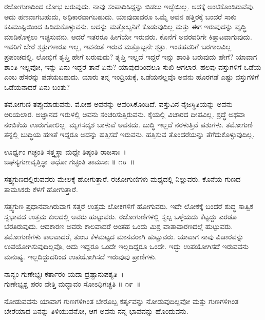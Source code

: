 ರಜೋಗುಣದಿಂದ ಲೋಭ ಬರುವುದು. ನಾವು ಸಂಪಾದಿಸಿದ್ದನ್ನು ಬಿಡಲು ಇಚ್ಛೆಯಿಲ್ಲ. ಅದಕ್ಕೆ ಅಂಟಿಕೊಂಡಿರುವೆವು. ಅದು ಹಣವಾಗಬಹುದು, ಅಧಿಕಾರವಾಗಬಹುದು. ಯಾವು\-ದಾದರೂ ಒಮ್ಮೆ ಅವನ ಹತ್ತಿರಕ್ಕೆ ಬಂದರೆ ಸಾಕು ಕಪಿಮುಷ್ಟಿಯಿಂದ ಹಿಡಿದುಕೊಳ್ಳುವನು. ಅದನ್ನು ಮತ್ತೊಬ್ಬನಿಗೆ ಕೊಡುವುದಿಲ್ಲ ಮತ್ತು ಈಗ ಇರುವುದನ್ನು ವೃದ್ಧಿ ಮಾಡಿಕೊಳ್ಳಲು ಇಚ್ಛಿಸುವನು. ಆದರೆ ಇತರರೂ ಹೀಗೆಯೇ ಇರುವರು. ಕೊನೆಗೆ ಅವರವರಿಗೇ ಕಿತ್ತಾಟವಾಗುವುದು. ಇವರಿಗೆ ಬೇರೆ ಶತ್ರುಗಳಾರೂ ಇಲ್ಲ, ಇವನಂತೆ ಇರುವ ಮತ್ತೊಬ್ಬನೇ ಶತ್ರು. ಇಂತಹವರಿಗೆ ಬರಗಾಲವಿಲ್ಲ ಪ್ರಪಂಚದಲ್ಲಿ. ಲೋಭಿಗೆ ತೃಪ್ತಿ ಹೇಗೆ ಬರುವುದು? ತೃಪ್ತಿ ಇಲ್ಲದೆ ಇದ್ದರೆ ಇನ್ನು ಶಾಂತಿ ಬರುವುದು ಹೇಗೆ? ಯಾವಾಗ ಶಾಂತಿ ಇಲ್ಲವೋ, ಇನ್ನು ಏನು ಇದ್ದರೆ ತಾನೆ ಏನು? ಯಾವುದರಿಂದಲೂ ಸುಖಿ ಆಗಲಾರ. ಹಲವು ವಸ್ತುಗಳಿಗೆ ಒಡೆಯ ಎಂಬ ಹೆಸರನ್ನು ಪಡೆಯಬಹುದು. ಯಾರು ತನ್ನ ಇಂದ್ರಿಯಕ್ಕೆ, ಒಡೆಯನಲ್ಲವೊ ಅವನು ಹೊರಗಡೆ ಎಷ್ಟು ವಸ್ತುಗಳಿಗೆ ಒಡೆಯನಾದರೆ ಏನು ಬಂತು?

ತಮೋಗುಣಿ ತಪ್ಪುಮಾಡುವನು. ಮೋಹ ಅವನನ್ನು ಆವರಿಸಿಕೊಂಡಿದೆ. ವಸ್ತುವಿನ ನೈಜಸ್ಥಿತಿಯನ್ನು ಅವನು ಅರಿಯಲಾರ. ಅಜ್ಞಾನದ ಇರುಳಲ್ಲಿ ಅವನು ಸಂಚರಿಸುತ್ತಿರುವನು. ಕೈಯಲ್ಲಿ ವಿಚಾರದ ದೀಪವಿಲ್ಲ. ಶ್ರದ್ಧೆ ಅಥವಾ ನಂಬಿಕೆಯ ಊರುಗೋಲಿಲ್ಲ. ಮೃಗಸದೃಶ ಬಾಳುವೆ ಅವನದು. ಬುದ್ಧಿ ಇಲ್ಲದೆ ನರಳುತ್ತಿವೆ ಪಶುಗಳು. ತಮೋಗುಣಿ ತನ್ನಲ್ಲಿ ಬುದ್ಧಿಯ ಹಣತೆ ಇದ್ದರೂ ಅದನ್ನು ಹತ್ತಿಸದೆ ಇರುವನು. ಹತ್ತಿಸುವ ತೊಂದರೆಯನ್ನು ತೆಗೆದುಕೊಳ್ಳುವುದಿಲ್ಲ.

\begin{shloka}
ಊರ್ಧ್ವಂ ಗಚ್ಛಂತಿ ಸತ್ತ್ವಸ್ಥಾ ಮಧ್ಯೇ ತಿಷ್ಠಂತಿ ರಾಜಸಾಃ~।\\ಜಘನ್ಯಗುಣವೃತ್ತಿಸ್ಥಾ ಅಧೋ ಗಚ್ಛಂತಿ ತಾಮಸಾಃ \hfill॥ ೧೮~॥
\end{shloka}

\begin{artha}
ಸತ್ತ್ವಗುಣದಲ್ಲಿರುವವರು ಮೇಲಕ್ಕೆ ಹೋಗುತ್ತಾರೆ. ರಜೋಗುಣಿಗಳು ಮಧ್ಯದಲ್ಲಿ ನಿಲ್ಲುವರು. ಕೊನೆಯ ಗುಣದ ತಾಮಸಿಕರು ಕೆಳಗೆ ಹೋಗುತ್ತಾರೆ.
\end{artha}

ಸತ್ತ್ವಗುಣ ಪ್ರಧಾನವಾಗಿರುವಾಗ ಸತ್ತರೆ ಉತ್ತಮ ಲೋಕಗಳಿಗೆ ಹೋಗುವರು. ಇದೇ ಲೋಕಕ್ಕೆ ಬಂದರೆ ಶುದ್ಧ ಸಾತ್ವಿಕ ಸ್ವಭಾವದ ಉತ್ತಮ ಕುಲದಲ್ಲಿ ಅವರು ಹುಟ್ಟುವರು. ರಜೋ\-ಗುಣಿಗಳಲ್ಲಿ ಸ್ವಲ್ಪ ಒಳ್ಳೆಯದು ಕೆಟ್ಟದ್ದು ಎರಡೂ ಬೆರತಿರುವುದು. ಆದಕಾರಣ ಅವರು ಕಾಲ\-ವಾದರೆ ಅಂತಹ ಒಂದು ಮಿಶ್ರ ವಾತಾವಾರಣದಲ್ಲೆ ಹುಟ್ಟುವರು. ತಮೋಗುಣಿಗಳು ಕಾಲವಾದರೆ, ತುಂಬ ಕೆಳಮಟ್ಟದ ಮಾನವರಾಗಿ ಹುಟ್ಟುವರು. ಯಾವಾಗ ನಾವು ವಿಚಾರವನ್ನು ಉಪಯೋಗಿಸುವುದಿಲ್ಲವೊ, ಅದು ಇದ್ದರೂ ಒಂದೇ ಇಲ್ಲದಿದ್ದರೂ ಒಂದೇ. ಇದ್ದು ಉಪಯೋಗಿ\-ಸದೆ ಇರುವವನು ಮನುಷ್ಯ. ಇಲ್ಲದಿದ್ದುದರಿಂದ ಉಪಯೋಗಿ\-ಸದೆ ಇರುವುವು ಪ್ರಾಣಿಗಳು.

\begin{shloka}
ನಾನ್ಯಂ ಗುಣೇಭ್ಯಃ ಕರ್ತಾರಂ ಯದಾ ದ್ರಷ್ಟಾನುಪಶ್ಯತಿ~।\\ಗುಣೇಭ್ಯಶ್ಚ ಪರಂ ವೇತ್ತಿ ಮದ್ಭಾವಂ ಸೋಽಧಿಗಚ್ಛತಿ \hfill॥ ೧೯~॥
\end{shloka}

\begin{artha}
ನೋಡುವವನು ಯಾವಾಗ ಗುಣಗಳಿಗಿಂತ ಬೇರೊಬ್ಬ ಕರ್ತೃವನ್ನು ನೋಡುವುದಿಲ್ಲವೋ ಮತ್ತು ಗುಣಗಳಿಗಿಂತ ಬೇರೆಯಾದ ಏನನ್ನು ತಿಳಿಯುವನೋ, ಆಗ ಅವನು ನನ್ನ ಭಾವವನ್ನು ಹೊಂದುವನು.
\end{artha}

